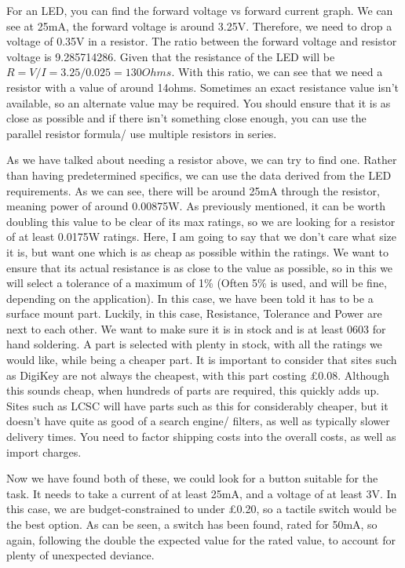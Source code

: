 \documentclass[a4paper,11pt]{report}
\begin{document}
For an LED, you can find the forward voltage vs forward current graph. We can see at 25mA, the forward voltage is around 3.25V. Therefore, we need to drop a voltage of 0.35V in a resistor. The ratio between the forward voltage and resistor voltage is 9.285714286. Given that the resistance of the LED will be $R=V/I=3.25/0.025=130Ohms$. With this ratio, we can see that we need a resistor with a value of around 14ohms. Sometimes an exact resistance value isn't available, so an alternate value may be required. You should ensure that it is as close as possible and if there isn't something close enough, you can use the parallel resistor formula/ use multiple resistors in series.

As we have talked about needing a resistor above, we can try to find one. Rather than having predetermined specifics, we can use the data derived from the LED requirements. As we can see, there will be around 25mA through the resistor, meaning power of around 0.00875W. As previously mentioned, it can be worth doubling this value to be clear of its max ratings, so we are looking for a resistor of at least 0.0175W ratings. Here, I am going to say that we don't care what size it is, but want one which is as cheap as possible within the ratings. We want to ensure that its actual resistance is as close to the value as possible, so in this we will select a tolerance of a maximum of 1\% (Often 5\% is used, and will be fine, depending on the application). In this case, we have been told it has to be a surface mount part. Luckily, in this case, Resistance, Tolerance and Power are next to each other. We want to make sure it is in stock and is at least 0603 for hand soldering. A part is selected with plenty in stock, with all the ratings we would like, while being a cheaper part. It is important to consider that sites such as DigiKey are not always the cheapest, with this part costing £0.08. Although this sounds cheap, when hundreds of parts are required, this quickly adds up. Sites such as LCSC will have parts such as this for considerably cheaper, but it doesn't have quite as good of a search engine/ filters, as well as typically slower delivery times. You need to factor shipping costs into the overall costs, as well as import charges.

Now we have found both of these, we could look for a button suitable for the task. It needs to take a current of at least 25mA, and a voltage of at least 3V. In this case, we are budget-constrained to under £0.20, so a tactile switch would be the best option. As can be seen, a switch has been found, rated for 50mA, so again, following the double the expected value for the rated value, to account for plenty of unexpected deviance.
\end{document}
